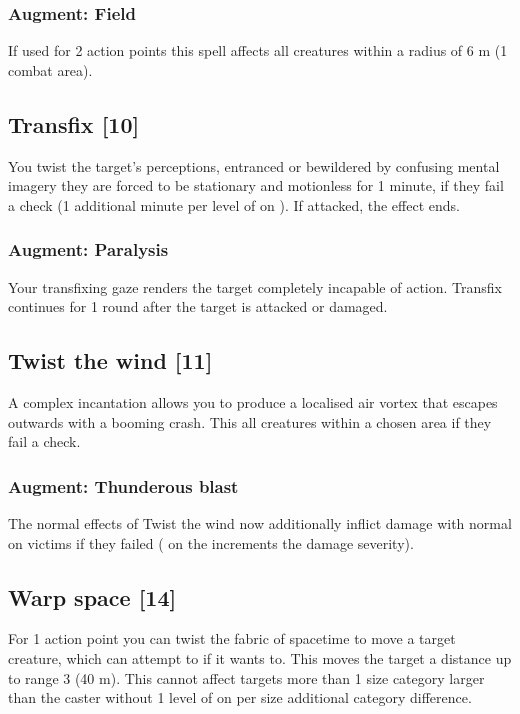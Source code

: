 \subsubsection{Augment: Field}
If used for 2 action points this spell affects all creatures within a radius of 6 m (1 combat area).

\subsection{Transfix [10]}
\label{spell:transfix}
You twist the target's perceptions, entranced or bewildered by confusing mental imagery they are forced to be stationary and motionless for 1 minute, if they fail a  check (1 additional minute per level of  on ). If attacked, the effect ends. 
\subsubsection{Augment: Paralysis}
Your transfixing gaze renders the target completely incapable of action. Transfix continues for 1 round after the target is attacked or damaged.

\subsection{Twist the wind [11]}
A complex incantation allows you to produce a localised air vortex that escapes outwards with a booming crash. This  all creatures within a chosen area if they fail a  check.
\subsubsection{Augment: Thunderous blast}
The normal effects of Twist the wind now additionally inflict damage with normal  on victims if they failed  ( on the  increments the damage severity).



\subsection{Warp space [14]}
For 1 action point you can twist the fabric of spacetime to move a target creature, which can attempt to  if it wants to. This moves the target a distance up to range 3 (40 m). This cannot affect targets more than 1 size category larger than the caster without 1 level of  on  per size additional category difference.

